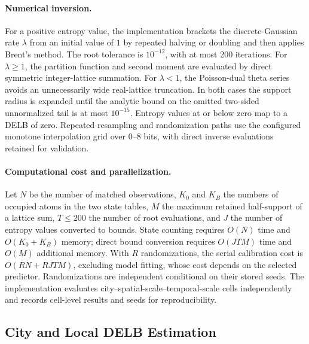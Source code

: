 \documentclass[applsci,article,accept,moreauthors]{Definitions/mdpi}
\def\hl#1{#1}%
\begin{document}
\paragraph{\hl{Numerical inversion.} %
}
For a positive entropy value, the implementation brackets the
discrete-Gaussian rate \(\lambda\) from an initial value of \(1\) by repeated
halving or doubling and then applies Brent's method. The root tolerance is
\(10^{-12}\), with at most 200 iterations. For \(\lambda\geq1\), the
partition function and second moment are evaluated by direct symmetric
integer-lattice summation. For \(\lambda<1\), the Poisson-dual theta series
avoids an unnecessarily wide real-lattice truncation. In both cases the
support radius is expanded until the analytic bound on the omitted
two-sided unnormalized tail is at most \(10^{-15}\). Entropy values at or
below zero map to a DELB of zero. Repeated resampling and randomization paths
use the configured monotone interpolation grid over 0--8 bits, with direct
inverse evaluations retained for validation.

\paragraph{\hl{Computational cost and parallelization.}}
Let \(N\) be the number of matched observations, \(K_0\) and \(K_B\) the
numbers of occupied atoms in the two state tables, \(M\) the maximum retained
half-support of a lattice sum, \(T\leq200\) the number of root evaluations,
and \(J\) the number of entropy values converted to bounds. State counting
requires \(O(N)\) time and \(O(K_0+K_B)\) memory; direct bound conversion
requires \(O(JTM)\) time and \(O(M)\) additional memory. With \(R\)
randomizations, the serial calibration cost is
\(O(RN+RJTM)\), excluding model fitting, whose cost depends on the selected
predictor. Randomizations are independent conditional on their stored seeds.
The implementation evaluates city--spatial-scale--temporal-scale cells
independently and records cell-level results and seeds for reproducibility.


\subsection{City and Local DELB Estimation}
\label{subsec:city_local_information}
\end{document}
